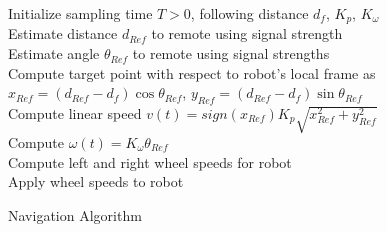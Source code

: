 \documentclass[letterpaper,12pt]{article}   %
\begin{document}
\begin{algorithm}[h!]
  \SetAlgoLined
  \Begin
  {
    Initialize sampling time $T > 0$, following distance $d_f$, $K_p$, $K_\omega$\\
    {
      Estimate distance $d_{Ref}$ to remote using signal strength\\
      Estimate angle $\theta_{Ref}$ to remote using signal strengths\\
      Compute target point with respect to robot's local frame as $x_{Ref} = (d_{Ref} - d_f)\cos \theta_{Ref}$, $y_{Ref} = (d_{Ref} - d_f)\sin \theta_{Ref}$\\
      Compute linear speed $v(t) = sign(x_{Ref})K_p\sqrt{x_{Ref}^2 + y_{Ref}^2}$\\
      Compute $\omega(t) = K_\omega \theta_{Ref}$\\
      Compute left and right wheel speeds for robot\\
      Apply wheel speeds to robot\\
    }
  }
  \caption{Navigation Algorithm}
  \label{alg:navAlgo}
\end{algorithm}






\end{document}
